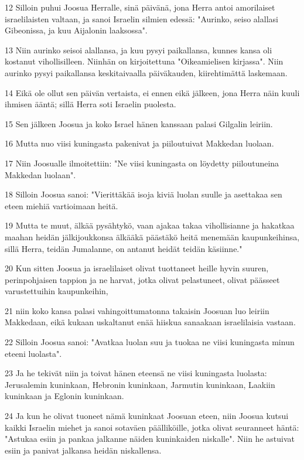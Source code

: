 \par 12 Silloin puhui Joosua Herralle, sinä päivänä, jona Herra antoi amorilaiset israelilaisten valtaan, ja sanoi Israelin silmien edessä: "Aurinko, seiso alallasi Gibeonissa, ja kuu Aijalonin laaksossa".
\par 13 Niin aurinko seisoi alallansa, ja kuu pysyi paikallansa, kunnes kansa oli kostanut vihollisilleen. Niinhän on kirjoitettuna "Oikeamielisen kirjassa". Niin aurinko pysyi paikallansa keskitaivaalla päiväkauden, kiirehtimättä laskemaan.
\par 14 Eikä ole ollut sen päivän vertaista, ei ennen eikä jälkeen, jona Herra näin kuuli ihmisen ääntä; sillä Herra soti Israelin puolesta.
\par 15 Sen jälkeen Joosua ja koko Israel hänen kanssaan palasi Gilgalin leiriin.
\par 16 Mutta nuo viisi kuningasta pakenivat ja piiloutuivat Makkedan luolaan.
\par 17 Niin Joosualle ilmoitettiin: "Ne viisi kuningasta on löydetty piiloutuneina Makkedan luolaan".
\par 18 Silloin Joosua sanoi: "Vierittäkää isoja kiviä luolan suulle ja asettakaa sen eteen miehiä vartioimaan heitä.
\par 19 Mutta te muut, älkää pysähtykö, vaan ajakaa takaa vihollisianne ja hakatkaa maahan heidän jälkijoukkonsa älkääkä päästäkö heitä menemään kaupunkeihinsa, sillä Herra, teidän Jumalanne, on antanut heidät teidän käsiinne."
\par 20 Kun sitten Joosua ja israelilaiset olivat tuottaneet heille hyvin suuren, perinpohjaisen tappion ja ne harvat, jotka olivat pelastuneet, olivat päässeet varustettuihin kaupunkeihin,
\par 21 niin koko kansa palasi vahingoittumatonna takaisin Joosuan luo leiriin Makkedaan, eikä kukaan uskaltanut enää hiiskua sanaakaan israelilaisia vastaan.
\par 22 Silloin Joosua sanoi: "Avatkaa luolan suu ja tuokaa ne viisi kuningasta minun eteeni luolasta".
\par 23 Ja he tekivät niin ja toivat hänen eteensä ne viisi kuningasta luolasta: Jerusalemin kuninkaan, Hebronin kuninkaan, Jarmutin kuninkaan, Laakiin kuninkaan ja Eglonin kuninkaan.
\par 24 Ja kun he olivat tuoneet nämä kuninkaat Joosuan eteen, niin Joosua kutsui kaikki Israelin miehet ja sanoi sotaväen päälliköille, jotka olivat seuranneet häntä: "Astukaa esiin ja pankaa jalkanne näiden kuninkaiden niskalle". Niin he astuivat esiin ja panivat jalkansa heidän niskallensa.
